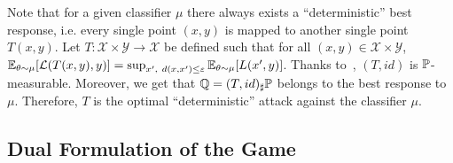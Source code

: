 \begin{rmq}
Note that for a given classifier $\mu$ there always exists a ``deterministic'' best response, i.e. every single point $(x,y)$ is mapped to another single point $T(x,y)$. Let $T:\mathcal{X}\times\mathcal{Y}\to\mathcal{X}$ be defined such that for all $(x,y)\in\mathcal{X}\times\mathcal{Y}$, $\EE_{\theta\sim\mu}\left[\loss(T(x,y),y)\right] = \sup_{x',~d(x,x')\leq\varepsilon}\EE_{\theta\sim\mu}\left[ L(x',y)\right]$. Thanks to~\citep[Proposition 7.50]{bertsekas2004stochastic}, $(T,id)$ is $\mathbb{P}$-measurable. Moreover, we get that $\mathbb{Q} = (T,id)_\sharp \mathbb{P}$ belongs to the best response to $\mu$. Therefore, $T$ is the optimal ``deterministic'' attack against the classifier $\mu$.
\end{rmq}




\subsection{Dual Formulation of the Game}

